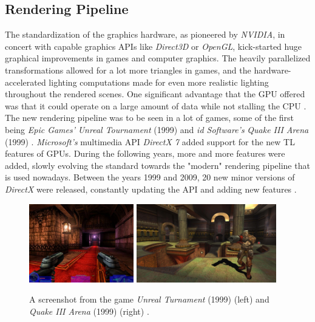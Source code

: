 \subsection*{Rendering Pipeline} \label{subsec-rendering-pipeline}

The standardization of the graphics hardware, as pioneered by \emph{NVIDIA}, in concert with capable 
graphics \ac{API}s like \emph{Direct3D} or \emph{OpenGL}, kick-started huge graphical improvements in 
games and computer graphics. The heavily parallelized transformations allowed for a lot more triangles 
in games, and the hardware-accelerated lighting computations made for even more realistic lighting 
throughout the rendered scenes. One significant advantage that the \ac{GPU} offered was that it could 
operate on a large amount of data while not stalling the \ac{CPU} \cite{Fenno2024}.\\

\noindent
The new rendering pipeline was to be seen in a lot of games, some of the first being \emph{Epic Games'} 
\emph{Unreal Tournament} (1999) and \emph{id Software's} \emph{Quake III Arena} (1999) \cite{UnrealTurnament, 
Quake3Arena}. \emph{Microsoft's} multimedia \ac{API} \emph{DirectX 7} added support for the new \ac{TL} 
features of \ac{GPU}s. During the following years, more and more features were added, slowly evolving the 
standard towards the "modern" rendering pipeline that is used nowadays. Between the years 1999 and 2009,
20 new minor versions of \emph{DirectX} were released, constantly updating the \ac{API} and adding new 
features \cite{WikiDirectX}.

\begin{figure}[h]
    \centering
    \includegraphics[width=172.5px]{images/graphics/unreal-turnament.jpg}
    \includegraphics[width=230px]{images/graphics/quake-iii-arena.jpg}
    \caption{A screenshot from the game \emph{Unreal Turnament} (1999) (left) and \emph{Quake III Arena} (1999) 
    (right) \cite{GamespotUnrealTurnament, GameWatcher2006}.}
    \label{fig:unreal-turnament-quake-arena}
\end{figure}


